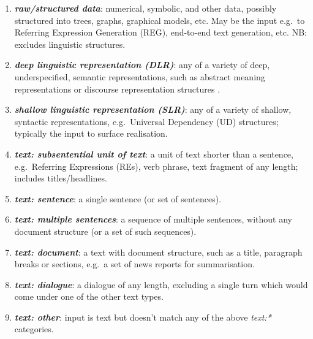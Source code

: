 \documentclass[11pt,a4paper]{article}
\newcommand{\egcvalue}[1]{\textbf{\textit{#1}}}
\begin{document}
\begin{enumerate}[itemsep=0cm,leftmargin=0.5cm,label={\small $\square$}]
            \item \egcvalue{raw/structured data}: numerical, symbolic, and other data, possibly structured into trees, graphs, graphical models, etc. May be the input e.g.\ to Referring Expression Generation (REG), end-to-end text generation, etc. {NB}: excludes linguistic structures.
            
            \item \egcvalue{deep linguistic representation (DLR)}: any of a variety of deep, underspecified, semantic representations, such as abstract meaning representations \citep[AMRs;][]{banarescu-etal-2013-abstract} or discourse representation structures \citep[DRSs;][]{kamp-reyle2013discourse}.
            
            \item \egcvalue{shallow linguistic representation (SLR)}: any of a variety of shallow, syntactic representations, e.g.\ Universal Dependency (UD) structures; typically the input to surface realisation.
            
            \item \egcvalue{text: subsentential unit of text}: a unit of text shorter than a sentence, e.g.\ Referring Expressions (REs), verb phrase, text fragment of any length; includes titles/headlines.
            
            \item \egcvalue{text: sentence}: a single sentence (or set of sentences).
            
            \item \egcvalue{text: multiple sentences}: a sequence of multiple sentences, without any document structure (or a set of such sequences). 
            
            \item \egcvalue{text: document}: a text with document structure, such as a title, paragraph breaks or sections, e.g.\ a set of news reports for summarisation.
            
            \item \egcvalue{text: dialogue}: a dialogue of any length, excluding a single turn which would come under one of the other text types.
            
            \item \egcvalue{text: other}: input is text but doesn't match any of the above \textit{text:*} categories.
            

\end{enumerate}
\end{document}

